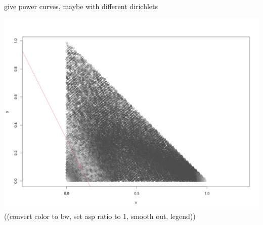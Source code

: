 \documentclass{article}
\begin{document}
give power curves, maybe with different dirichlets

\includegraphics[width=\textwidth]{power.png}
((convert color to bw, set asp ratio to 1, smooth out, legend))
\end{document}

